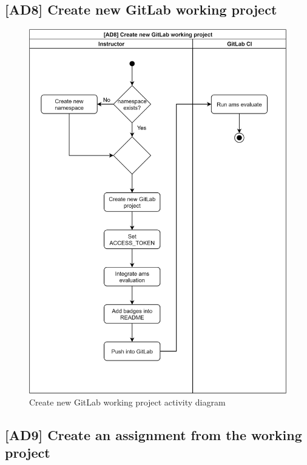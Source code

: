 \subsection{{[}AD8{]} Create new GitLab working project} \label{ssec:ad8}

\begin{figure}[H]
    \centering
    \includegraphics[width=\textwidth,height=.85\textheight,keepaspectratio]{Figures/ad/ad8.png}
    \caption{Create new GitLab working project activity diagram}
\end{figure}

\subsection{{[}AD9{]} Create an assignment from the working project} \label{ssec:ad9}


